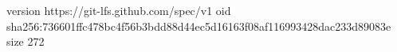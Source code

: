 version https://git-lfs.github.com/spec/v1
oid sha256:736601ffc478bc4f56b3bdd88d44ec5d16163f08af116993428dac233d89083e
size 272
